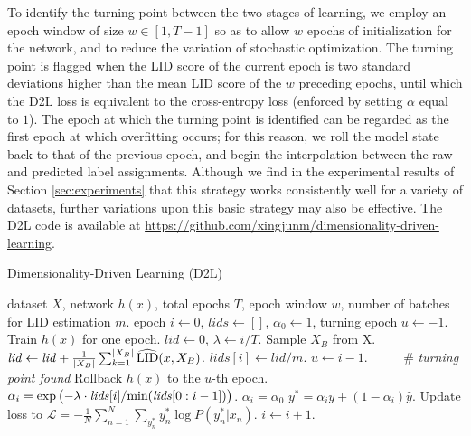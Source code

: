 \documentclass{article}
\begin{document}
To identify the turning point between the two stages of learning, we employ an epoch window of size $w \in [1, T-1]$ so as to allow $w$ epochs of initialization for the network, and to reduce the variation of stochastic optimization. The turning point is flagged when the LID score of the current epoch is two standard deviations higher than the mean LID score of the $w$ preceding epochs, until which the D2L loss is equivalent to the cross-entropy loss (enforced by setting $\alpha$ equal to $1$). The epoch at which the turning point is identified can be regarded as the first epoch at which overfitting occurs; for this reason, we roll the model state back to that of the previous epoch, and begin the interpolation between the raw and predicted label assignments. 
Although we find in the experimental results of Section \ref{sec:experiments} that this strategy works consistently well for a variety of datasets, further variations upon this basic strategy may also be effective. The D2L code is available at \url{https://github.com/xingjunm/dimensionality-driven-learning}.

\begin{algorithm}[tb]
   \caption{Dimensionality-Driven Learning (D2L)}
   \label{alg:manifold}
\begin{algorithmic}
    dataset $X$, network $h(x)$, total epochs $T$, epoch window $w$, number of batches for LID estimation  $m$.
   epoch $i\leftarrow 0$, $\mathit{lids} \leftarrow []$, $\alpha_0 \leftarrow 1$, turning epoch $u \leftarrow {-1}$.
  \REPEAT
\STATE Train $h(x)$ for one epoch.
   \STATE $\mathit{lid} \leftarrow 0$, $\lambda \leftarrow i/T$.
   \STATE Sample $X_B$ from X.
   \STATE $\mathit{lid} \leftarrow \mathit{lid} + \frac{1}{|X_B|}\sum_{k=1}^{|X_B|}\widehat{\textup{LID}}(x, X_B)$.
   \ENDFOR
   \STATE $\mathit{lids[i]} \leftarrow \mathit{lid} / m$.
   \STATE $u \leftarrow i - 1$. ~~~~~\# \textit{turning point found}
   \STATE Rollback $h(x)$ to the $u$-th epoch.
   \ENDIF
   \STATE $\alpha_i = \exp \big({-\lambda}\cdot\mathit{lids}[i] / \textup{min}(\mathit{lids}[0:i-1])\big)$.
\ELSE
   \STATE $\alpha_i = \alpha_0$
  \ENDIF
   \STATE  $y^{*} = \alpha_i y + (1 - \alpha_i) \widehat y$.
   \STATE Update loss to $\mathcal{L} = - \frac{1}{N}\sum_{n = 1}^{N} \sum_{y_n^*} y_n^*\log P(y_n^*|x_n)$.
   \STATE $i \leftarrow i+1$.
\end{algorithmic}
\end{algorithm}
\end{document}

